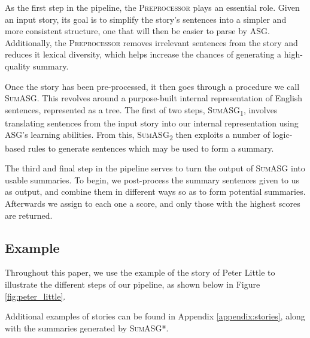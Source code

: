 \noindent
As the first step in the pipeline, the \textsc{Preprocessor} plays an essential role. Given an input story, its goal is to simplify the story's sentences into a simpler and more consistent structure, one that will then be easier to parse by ASG. Additionally, the \textsc{Preprocessor} removes irrelevant sentences from the story and reduces it lexical diversity, which helps increase the chances of generating a high-quality summary.

Once the story has been pre-processed, it then goes through a procedure we call \textsc{SumASG}. This revolves around a purpose-built internal representation of English sentences, represented as a tree. The first of two steps, \textsc{SumASG\textsubscript{1}}, involves translating sentences from the input story into our internal representation using ASG's learning abilities. From this, \textsc{SumASG\textsubscript{2}} then exploits a number of logic-based rules to generate sentences which may be used to form a summary.

The third and final step in the pipeline serves to turn the output of \textsc{SumASG} into usable summaries. To begin, we post-process the summary sentences given to us as output, and combine them in different ways so as to form potential summaries. Afterwards we assign to each one a score, and only those with the highest scores are returned.

\subsection*{Example}

Throughout this paper, we use the example of the story of Peter Little to illustrate the different steps of our pipeline, as shown below in Figure \ref{fig:peter_little}.

Additional examples of stories can be found in Appendix \ref{appendix:stories}, along with the summaries generated by \textsc{SumASG*}.

